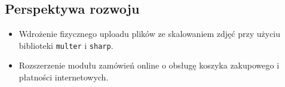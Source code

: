 \documentclass[12pt,a4paper]{article}
\begin{document}
\subsection{Perspektywa rozwoju}
\begin{itemize}
    \item Wdrożenie fizycznego uploadu plików ze skalowaniem zdjęć przy użyciu biblioteki \texttt{multer} i \texttt{sharp}.
    \item Rozszerzenie modułu zamówień online o obsługę koszyka zakupowego i płatności internetowych.
\end{itemize}
\end{document}
